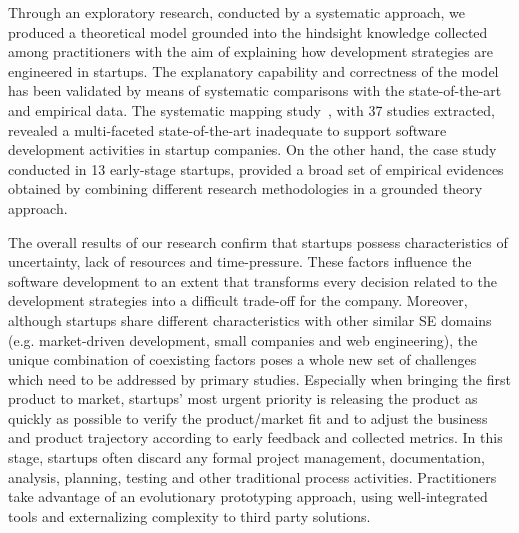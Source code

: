\documentclass[10pt,journal,letterpaper,compsoc]{IEEEtran}
\begin{document}
Through an exploratory research, conducted by a systematic approach, we
produced a theoretical model grounded into the hindsight knowledge collected
among practitioners with the aim of explaining how development strategies are
engineered in startups. The explanatory capability and correctness of the model
has been validated by means of systematic comparisons with the state-of-the-art 
and empirical data. The systematic mapping study~\cite{SMS}, with 37
studies extracted, revealed a multi-faceted state-of-the-art inadequate to
support software development activities in startup companies. 
On the other hand, the case study conducted in 13 early-stage startups, 
provided a broad set of empirical evidences obtained by combining different 
research methodologies in a grounded theory approach.

The overall results of our research confirm that startups possess 
characteristics of uncertainty, lack of resources and time-pressure. These 
factors influence the software development to an extent that
transforms every decision related to the development strategies into a
difficult trade-off for the company. Moreover, although startups share
different characteristics with other similar SE domains (e.g. market-driven
development, small companies and web engineering), the unique combination of
coexisting factors poses a whole new set of challenges which need to be
addressed by primary studies. Especially when bringing the first product to
market, startups' most urgent priority is releasing the product as quickly as
possible to verify the product/market fit and to adjust the business and
product trajectory according to early feedback and collected metrics. In this
stage, startups often discard any formal project management, documentation,
analysis, planning, testing and other traditional process activities.
Practitioners take advantage of an evolutionary prototyping approach, using
well-integrated tools and externalizing complexity to third party solutions.
\end{document}
